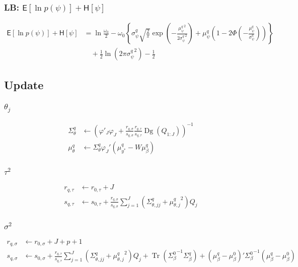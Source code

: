 \documentclass[11pt]{article}
\DeclareMathOperator{\Tr}{Tr}
\newcommand{\opn}{\operatorname}
\begin{document}
\subsubsection{LB: $\mathsf{E}\left[\ln p\left(\psi\right)\right] +\mathsf{H}\left[\psi\right]$}
\begin{align*}
  \mathsf{E}\left[\ln p\left(\psi\right)\right] +\mathsf{H}\left[\psi\right] &= \ln\frac{\omega_{0}}{2} -\omega_{0}\left\{\sigma_{\psi}^{q}\sqrt{\frac{2}{\pi}} \exp\left(-\frac{{\mu_{\psi}^{q}}^{2}}{2{\sigma_{\psi}^{q}}^{2}}\right) + \mu_{\psi}^{q}\left(1-2\Phi\left(-\frac{\mu_{\psi}^{q}}{\sigma_{\psi}^{q}}\right)\right) \right\}\\
  &\quad +\frac{1}{2}\ln\left(2\pi {\sigma_{\psi}^{q}}^{2}\right) -\frac{1}{2}
\end{align*}
\subsection{Update}
\subsubsection{$\theta_{j}$}
\begin{align*}
  \Sigma_{\theta}^{q} &\leftarrow \left(\varphi'_{J}\varphi_{J} +\frac{r_{q,\sigma}}{s_{q,\sigma}}\frac{r_{q,\tau}}{s_{q,\tau}}\opn{Dg}\left(Q_{1:J}\right) \right)^{-1}\\
  \mu_{\theta}^{q} &\leftarrow \Sigma_{\theta}^{q}\varphi_{J}'\left(\mu_{y^{*}}^{q}-W\mu_{\beta}^{q}\right)
\end{align*}
\subsubsection{$\tau^{2}$}
\begin{align*}
  r_{q,\tau} &\leftarrow r_{0,\tau} +J\\
  s_{q,\tau} &\leftarrow s_{0,\tau} + \frac{r_{q,\sigma}}{s_{q,\sigma}}\sum_{j=1}^{J}\left(\Sigma_{\theta, jj}^{q}+{\mu_{\theta, j}^{q}}^{2}\right)Q_{j}
\end{align*}
\subsubsection{$\sigma^{2}$}
\begin{align*}
  r_{q,\sigma} &\leftarrow r_{0,\sigma} + J + p + 1\\
  s_{q,\sigma} &\leftarrow s_{0,\sigma} +\frac{r_{q,\tau}}{s_{q,\tau}}\sum_{j=1}^{J}\left(\Sigma_{\theta, jj}^{q}+{\mu_{\theta, j}^{q}}^{2}\right)Q_{j} + \Tr\left({\Sigma_{\beta}^{0}}^{-1}\Sigma_{\beta}^{q}\right) +\left(\mu_{\beta}^{q}-\mu_{\beta}^{0}\right)'{\Sigma_{\beta}^{0}}^{-1}\left(\mu_{\beta}^{q}-\mu_{\beta}^{0}\right)
\end{align*}
\end{document}
